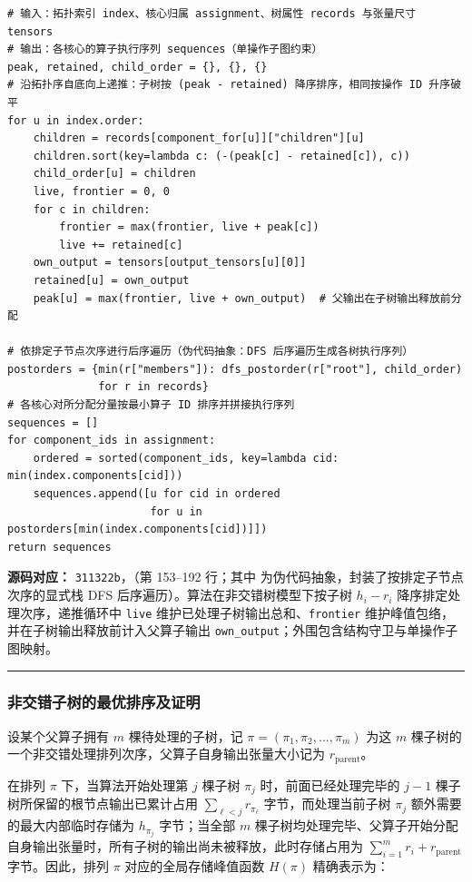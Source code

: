 \documentclass[anonymous,withtoc]{gmcm2026}
\begin{document}
\begin{lstlisting}[style=paperpseudo]
# 输入：拓扑索引 index、核心归属 assignment、树属性 records 与张量尺寸 tensors
# 输出：各核心的算子执行序列 sequences（单操作子图约束）
peak, retained, child_order = {}, {}, {}
# 沿拓扑序自底向上递推：子树按 (peak - retained) 降序排序，相同按操作 ID 升序破平
for u in index.order:
    children = records[component_for[u]]["children"][u]
    children.sort(key=lambda c: (-(peak[c] - retained[c]), c))
    child_order[u] = children
    live, frontier = 0, 0
    for c in children:
        frontier = max(frontier, live + peak[c])
        live += retained[c]
    own_output = tensors[output_tensors[u][0]]
    retained[u] = own_output
    peak[u] = max(frontier, live + own_output)  # 父输出在子树输出释放前分配

# 依排定子节点次序进行后序遍历（伪代码抽象：DFS 后序遍历生成各树执行序列）
postorders = {min(r["members"]): dfs_postorder(r["root"], child_order)
              for r in records}
# 各核心对所分配分量按最小算子 ID 排序并拼接执行序列
sequences = []
for component_ids in assignment:
    ordered = sorted(component_ids, key=lambda cid: min(index.components[cid]))
    sequences.append([u for cid in ordered
                      for u in postorders[min(index.components[cid])]])
return sequences
\end{lstlisting}
\textbf{源码对应：} \texttt{311322b}，\texttt{}（第 153--192 行；其中 \texttt{} 为伪代码抽象，封装了按排定子节点次序的显式栈 DFS 后序遍历）。算法在非交错树模型下按子树 \(h_i - r_i\) 降序排定处理次序，递推循环中 \texttt{live} 维护已处理子树输出总和、\texttt{frontier} 维护峰值包络，并在子树输出释放前计入父算子输出 \texttt{own\_output}；外围包含结构守卫与单操作子图映射。

\par\hrule\endgroup

\subsubsection{非交错子树的最优排序及证明}

设某个父算子拥有 \(m\) 棵待处理的子树，记 \(\pi = (\pi_1, \pi_2, \dots, \pi_m)\) 为这 \(m\) 棵子树的一个非交错处理排列次序，父算子自身输出张量大小记为 \(r_{\mathrm{parent}}\)。

在排列 \(\pi\) 下，当算法开始处理第 \(j\) 棵子树 \(\pi_j\) 时，前面已经处理完毕的 \(j - 1\) 棵子树所保留的根节点输出已累计占用 \(\sum_{\ell < j} r_{\pi_\ell}\) 字节，而处理当前子树 \(\pi_j\) 额外需要的最大内部临时存储为 \(h_{\pi_j}\) 字节；当全部 \(m\) 棵子树均处理完毕、父算子开始分配自身输出张量时，所有子树的输出尚未被释放，此时存储占用为 \(\sum_{i=1}^m r_i + r_{\mathrm{parent}}\) 字节。因此，排列 \(\pi\) 对应的全局存储峰值函数 \(H(\pi)\) 精确表示为：
\end{document}
